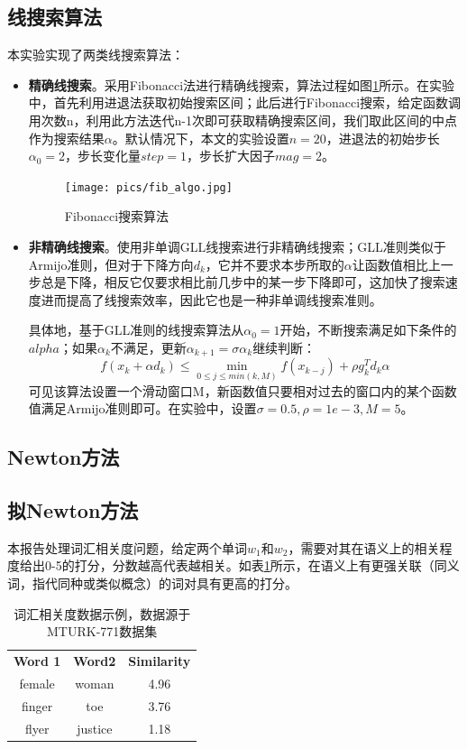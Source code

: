 \documentclass{article}
\begin{document}
\subsection{线搜索算法}
本实验实现了两类线搜索算法：
\begin{itemize}
  \item \textbf{精确线搜索}。采用Fibonacci法进行精确线搜索，算法过程如图\ref{fig:fib_algo}所示。在实验中，首先利用进退法获取初始搜索区间；此后进行Fibonacci搜索，给定函数调用次数n，利用此方法迭代n-1次即可获取精确搜索区间，我们取此区间的中点作为搜索结果$\alpha$。默认情况下，本文的实验设置$n=20$，进退法的初始步长$\alpha_0=2$，步长变化量$step=1$，步长扩大因子$mag=2$。
  \begin{figure}[h]
    \centering
    \texttt{[image: pics/fib\_algo.jpg]}
    \caption{Fibonacci搜索算法}
    \label{fig:fib_algo}
  \end{figure}
  \item \textbf{非精确线搜索}。使用非单调GLL线搜索进行非精确线搜索；GLL准则类似于Armijo准则，但对于下降方向$d_k$，它并不要求本步所取的$\alpha$让函数值相比上一步总是下降，相反它仅要求相比前几步中的某一步下降即可，这加快了搜索速度进而提高了线搜索效率，因此它也是一种非单调线搜索准则。
  
  具体地，基于GLL准则的线搜索算法从$\alpha_0 = 1$开始，不断搜索满足如下条件的$alpha$；如果$\alpha_k$不满足，更新$\alpha_{k+1} = \sigma\alpha_k$继续判断：
  \[ f(x_k + \alpha d_k) \leq \min\limits_{0\leq j \leq min(k, M)} f(x_{k-j}) + \rho g_k^T d_k \alpha \]
  可见该算法设置一个滑动窗口M，新函数值只要相对过去的窗口内的某个函数值满足Armijo准则即可。在实验中，设置$\sigma=0.5, \rho=1e-3, M=5$。
\end{itemize}



\subsection{Newton方法}

\subsection{拟Newton方法}

本报告处理词汇相关度问题，给定两个单词$w_1$和$w_2$，需要对其在语义上的相关程度给出0-5的打分，分数越高代表越相关。如表\ref{tab:dataset_eg}所示，在语义上有更强关联（同义词，指代同种或类似概念）的词对具有更高的打分。

\begin{table}[h]
  \centering
  \begin{tabular}{c c c}
    \toprule
    \bfseries Word 1 & \bfseries Word2 & \bfseries Similarity \\
    \cmidrule(lr){1-3}
    female & woman & 4.96 \\
    finger & toe & 3.76 \\
    flyer & justice & 1.18\\
    \bottomrule
  \end{tabular}
  \caption{词汇相关度数据示例，数据源于MTURK-771数据集}
  \label{tab:dataset_eg}
\end{table}
\end{document}
